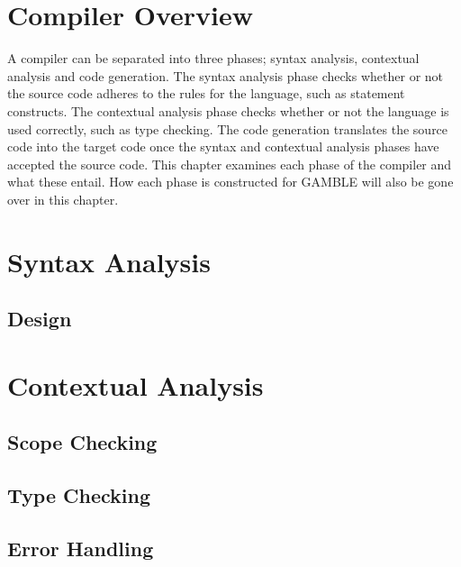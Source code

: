 \chapter{Compiler Overview}
A compiler can be separated into three phases; syntax analysis, contextual analysis and code generation.
The syntax analysis phase checks whether or not the source code adheres to the rules for the language, such as statement constructs.
The contextual analysis phase checks whether or not the language is used correctly, such as type checking.
The code generation translates the source code into the target code once the syntax and contextual analysis phases have accepted the source code.
This chapter examines each phase of the compiler and what these entail.
How each phase is constructed for GAMBLE will also be gone over in this chapter. %



\chapter{Syntax Analysis}
\section{Design}









\chapter{Contextual Analysis}



\section{Scope Checking}


\section{Type Checking}


\section{Error Handling}





